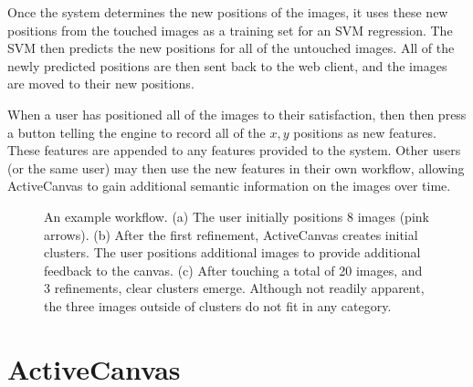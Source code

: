 \documentclass[journal]{vgtc}
\begin{document}
{Once the system determines the new positions of the images, it uses these new positions from the touched images as a training set for an SVM regression.  The SVM then predicts the new positions for all of the untouched images.  All of the newly predicted positions are then sent back to the web client, and the images are moved to their new positions. 

When a user has positioned all of the images to their satisfaction, then then press a button telling the engine to record all of the $x,y$ positions as new features. These features are appended to any features provided to the system. Other users (or the same user) may then use the new features in their own workflow, allowing ActiveCanvas to gain additional semantic information on the images over time.
}

\begin{figure}[h]
\centering
\begin{subfigure}[Initial Arrangement\label{fig:step1}]{\texttt{[image: Figs/moved\_images.pdf]}}
\end{subfigure}
\begin{subfigure}[First Refinement\label{fig:step2}]{\texttt{[image: Figs/round1.pdf]}}
\end{subfigure}
\begin{subfigure}[Final Refinement, 20 images touched\label{fig:finalstep}]{\texttt{[image: Figs/final\_arrangment\_20touched.pdf]}}
\end{subfigure}
\caption{An example workflow.  (a) The user initially positions 8 images (pink arrows). (b) After the first refinement, ActiveCanvas creates initial clusters. The user positions additional images to provide additional feedback to the canvas. (c) After touching a total of 20 images, and 3  refinements, clear clusters emerge. Although not readily apparent, the three images outside of clusters do not fit in any category.}\label{fig:workflow}
\end{figure}

\section{ActiveCanvas}\label{sec:discussion}
\end{document}
